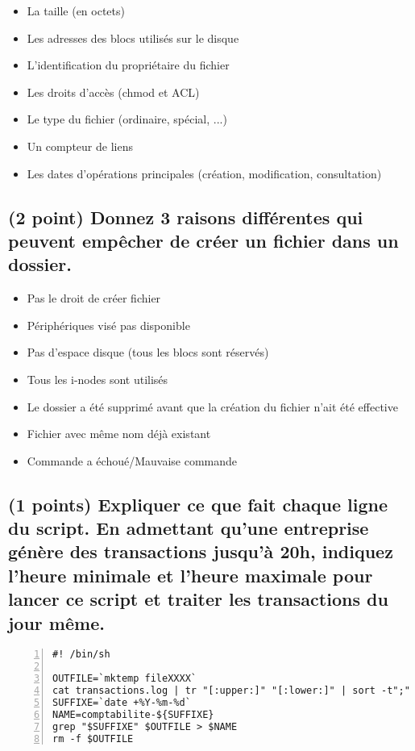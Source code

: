 \documentclass[11pt,a4paper]{article}
\begin{document}
\bigskip
\begin{itemize}
\item La taille (en octets)
\item Les adresses des blocs utilisés sur le disque
\item L'identification du propriétaire du fichier
\item Les droits d’accès (chmod et ACL)
\item Le type du fichier (ordinaire, spécial, ...)
\item Un compteur de liens
\item Les dates d'opérations principales (création, modification, consultation)
\end{itemize}
\bigskip

\pagebreak

\subsection{(2 point) Donnez 3 raisons différentes qui peuvent empêcher de créer un fichier dans un dossier.}

\bigskip
\begin{itemize}
\item Pas le droit de créer fichier
\item Périphériques visé pas disponible
\item Pas d'espace disque (tous les blocs sont réservés)
\item Tous les i-nodes sont utilisés
\item Le dossier a été supprimé avant que la création du fichier n'ait été effective
\item Fichier avec même nom déjà existant
\item Commande a échoué/Mauvaise commande
\end{itemize}
\bigskip

\subsection{(1 points) Expliquer ce que fait chaque ligne du script. En admettant qu'une entreprise génère des transactions jusqu'à 20h, indiquez l'heure minimale et l'heure maximale pour lancer ce script et traiter les transactions du jour même.}

\bigskip

\lstset{language=sh}
\begin{lstlisting}[frame=single,numbers=left,title={script.sh}]
#! /bin/sh

OUTFILE=`mktemp fileXXXX`
cat transactions.log | tr "[:upper:]" "[:lower:]" | sort -t";" -k1 -o $OUTFILE
SUFFIXE=`date +%Y-%m-%d`
NAME=comptabilite-${SUFFIXE}
grep "$SUFFIXE" $OUTFILE > $NAME
rm -f $OUTFILE

\end{lstlisting}
\end{document}
